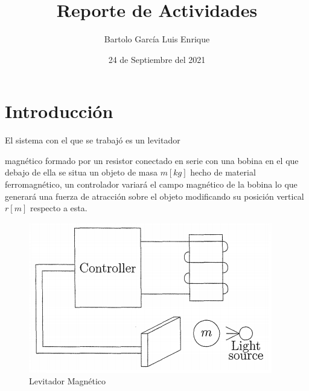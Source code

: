 \documentclass[onecolumn,10pt]{article}
\title{Reporte de Actividades}
\author{Bartolo Garc\'ia Luis Enrique}
\date{24 de Septiembre del 2021}
\begin{document}

\section{Introducci\'on}
El sistema con el que se trabaj\'o es un levitador 

magn\'etico formado por un resistor conectado en serie con una bobina en el que debajo de ella se situa un objeto de masa $m[kg]$ hecho de material ferromagn\'etico, un controlador variar\'a el campo magn\'etico de la bobina lo que generar\'a una fuerza de atracci\'on sobre el objeto modificando su posici\'on vertical $r[m]$ respecto a esta.

\begin{figure}[h]
\centering
\includegraphics[scale=0.5]{levitador.png}
\caption{Levitador Magn\'etico}
\label{levitador}
\end{figure}
\end{document}
